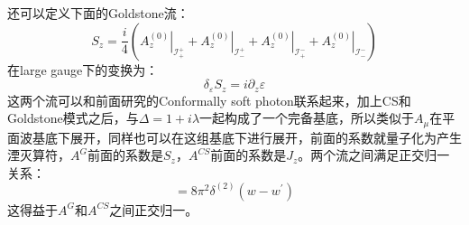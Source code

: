 还可以定义下面的Goldstone流\cite{Nande:2017dba}：
\begin{equation}
	S_z=\frac i4\left(\left.A_z^{(0)}\right|_{\mathcal{I}_+^+}+\left.A_z^{(0)}\right|_{\mathcal{I}_-^+}+\left.A_z^{(0)}\right|_{\mathcal{I}_+^-}+\left.A_z^{(0)}\right|_{\mathcal{I}_-^-}\right)
\end{equation}
在large gauge下的变换为：
\begin{equation}
	\delta_\varepsilon S_z=i\partial_z\varepsilon 
\end{equation}
这两个流可以和前面研究的Conformally soft photon联系起来，加上CS和Goldstone模式之后，与$\Delta=1+i\lambda$一起构成了一个完备基底，所以类似于$A_\mu$在平面波基底下展开，同样也可以在这组基底下进行展开，前面的系数就量子化为产生湮灭算符，$A^G$前面的系数是$S_z$，$A^{CS}$前面的系数是$J_z$\cite{Donnay:2018neh}。两个流之间满足正交归一关系：
\begin{equation}
	[J_w(w),S_{w^\prime}(w^\prime)]=8\pi^2\delta^{(2)}(w-w^\prime)
\end{equation}
这得益于$A^G$和$A^{CS}$之间正交归一。
